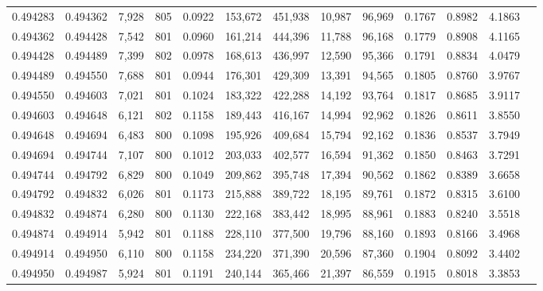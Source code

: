 \begin{tabular}{rrrrrrrrrrrrr}
0.494283 & 0.494362 &  7,928 & 805 &                                     0.0922 & 153,672 & 451,938 &  10,987 &  96,969 & 0.1767 & 0.8982 & 4.1863 \\
0.494362 & 0.494428 &  7,542 & 801 &                                     0.0960 & 161,214 & 444,396 &  11,788 &  96,168 & 0.1779 & 0.8908 & 4.1165 \\
0.494428 & 0.494489 &  7,399 & 802 &                                     0.0978 & 168,613 & 436,997 &  12,590 &  95,366 & 0.1791 & 0.8834 & 4.0479 \\
0.494489 & 0.494550 &  7,688 & 801 &                                     0.0944 & 176,301 & 429,309 &  13,391 &  94,565 & 0.1805 & 0.8760 & 3.9767 \\
0.494550 & 0.494603 &  7,021 & 801 &                                     0.1024 & 183,322 & 422,288 &  14,192 &  93,764 & 0.1817 & 0.8685 & 3.9117 \\
0.494603 & 0.494648 &  6,121 & 802 &                                     0.1158 & 189,443 & 416,167 &  14,994 &  92,962 & 0.1826 & 0.8611 & 3.8550 \\
0.494648 & 0.494694 &  6,483 & 800 &                                     0.1098 & 195,926 & 409,684 &  15,794 &  92,162 & 0.1836 & 0.8537 & 3.7949 \\
0.494694 & 0.494744 &  7,107 & 800 &                                     0.1012 & 203,033 & 402,577 &  16,594 &  91,362 & 0.1850 & 0.8463 & 3.7291 \\
0.494744 & 0.494792 &  6,829 & 800 &                                     0.1049 & 209,862 & 395,748 &  17,394 &  90,562 & 0.1862 & 0.8389 & 3.6658 \\
0.494792 & 0.494832 &  6,026 & 801 &                                     0.1173 & 215,888 & 389,722 &  18,195 &  89,761 & 0.1872 & 0.8315 & 3.6100 \\
0.494832 & 0.494874 &  6,280 & 800 &                                     0.1130 & 222,168 & 383,442 &  18,995 &  88,961 & 0.1883 & 0.8240 & 3.5518 \\
0.494874 & 0.494914 &  5,942 & 801 &                                     0.1188 & 228,110 & 377,500 &  19,796 &  88,160 & 0.1893 & 0.8166 & 3.4968 \\
0.494914 & 0.494950 &  6,110 & 800 &                                     0.1158 & 234,220 & 371,390 &  20,596 &  87,360 & 0.1904 & 0.8092 & 3.4402 \\
0.494950 & 0.494987 &  5,924 & 801 &                                     0.1191 & 240,144 & 365,466 &  21,397 &  86,559 & 0.1915 & 0.8018 & 3.3853 \\

\end{tabular}
